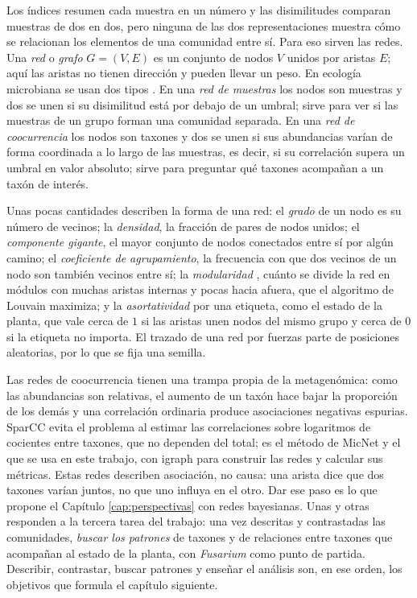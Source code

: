 Los índices resumen cada muestra en un número y las disimilitudes comparan muestras de dos en dos,
pero ninguna de las dos representaciones muestra cómo se relacionan los elementos de una comunidad
entre sí. Para eso sirven las redes. Una \emph{red} o \emph{grafo} $G = (V, E)$ es un conjunto de
nodos $V$ unidos por aristas $E$; aquí las aristas no tienen dirección y pueden llevar un peso. En
ecología microbiana se usan dos tipos \citep{berry2014deciphering}. En una \emph{red de muestras}
los nodos son muestras y dos se unen si su disimilitud está por debajo de un umbral; sirve para ver
si las muestras de un grupo forman una comunidad separada. En una \emph{red de coocurrencia} los
nodos son taxones y dos se unen si sus abundancias varían de forma coordinada a lo largo de las
muestras, es decir, si su correlación supera un umbral en valor absoluto; sirve para preguntar qué
taxones acompañan a un taxón de interés.

Unas pocas cantidades describen la forma de una red: el \emph{grado} de un nodo es su número de
vecinos; la \emph{densidad}, la fracción de pares de nodos unidos; el \emph{componente gigante},
el mayor conjunto de nodos conectados entre sí por algún camino; el \emph{coeficiente de
agrupamiento}, la frecuencia con que dos vecinos de un nodo son también vecinos entre sí; la
\emph{modularidad} \citep{newman2003mixing}, cuánto se divide la red en módulos con muchas aristas
internas y pocas hacia afuera, que el algoritmo de Louvain \citep{blondel2008fast} maximiza; y la
\emph{asortatividad} por una etiqueta, como el estado de la planta, que vale cerca de $1$ si las
aristas unen nodos del mismo grupo y cerca de $0$ si la etiqueta no importa. El trazado de una red
por fuerzas \citep{fruchterman1991graph} parte de posiciones aleatorias, por lo que se fija una
semilla.

Las redes de coocurrencia tienen una trampa propia de la metagenómica: como las abundancias son
relativas, el aumento de un taxón hace bajar la proporción de los demás y una correlación ordinaria
produce asociaciones negativas espurias. SparCC \citep{friedman2012inferring} evita el problema al
estimar las correlaciones sobre logaritmos de cocientes entre taxones, que no dependen del total;
es el método de MicNet \citep{favila2022micnet} y el que se usa en este trabajo, con igraph
\citep{csardi2006igraph} para construir las redes y calcular sus métricas. Estas redes describen
asociación, no causa: una arista dice que dos taxones varían juntos, no que uno influya en el otro.
Dar ese paso es lo que propone el Capítulo \ref{cap:perspectivas} con redes bayesianas. Unas y otras
responden a la tercera tarea del trabajo: una vez descritas y contrastadas las comunidades,
\emph{buscar los patrones} de taxones y de relaciones entre taxones que acompañan al estado de la
planta, con \textit{Fusarium} como punto de partida. Describir, contrastar, buscar patrones y
enseñar el análisis son, en ese orden, los objetivos que formula el capítulo siguiente.
